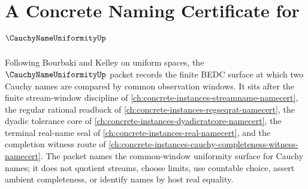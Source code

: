 \chapter{A Concrete Naming Certificate for $\CauchyNameUniformityUp$}
\label{ch:concrete-instances-cauchy-name-uniformity-namecert}

Following Bourbaki and Kelley on uniform spaces, the $\CauchyNameUniformityUp$ packet records the finite BEDC surface at which two Cauchy names are compared by common observation windows. It sits after the finite stream-window discipline of \autoref{ch:concrete-instances-streamname-namecert}, the regular rational readback of \autoref{ch:concrete-instances-regseqrat-namecert}, the dyadic tolerance core of \autoref{ch:concrete-instances-dyadicratcore-namecert}, the terminal real-name seal of \autoref{ch:concrete-instances-real-namecert}, and the completion witness route of \autoref{ch:concrete-instances-cauchy-completeness-witness-namecert}. The packet names the common-window uniformity surface for Cauchy names; it does not quotient streams, choose limits, use countable choice, assert ambient completeness, or identify names by host real equality.

